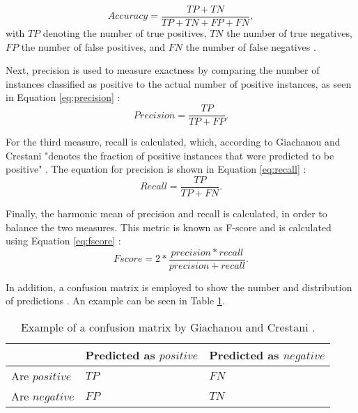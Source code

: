 \begin{equation}
    \label{eq:accuracy}
    Accuracy = \frac{TP + TN}{TP + TN + FP + FN},
\end{equation}
with $TP$ denoting the number of true positives, $TN$ the number of true negatives, $FP$ the number of false positives, and $FN$ the number of false negatives \cite{DBLP:journals/csur/GiachanouC16}.

Next, precision is used to measure exactness by comparing the number of instances classified as positive to the actual number of positive instances, as seen in Equation \eqref{eq:precision} \cite{DBLP:journals/csur/GiachanouC16}:
\begin{equation}
    \label{eq:precision}
    Precision = \frac{TP}{TP + FP}.
\end{equation}

For the third measure, recall is calculated, which, according to Giachanou and Crestani "denotes the fraction of positive instances that were predicted to be positive" \cite[p.~28:12]{DBLP:journals/csur/GiachanouC16}. The equation for precision is shown in Equation \eqref{eq:recall} \cite{DBLP:journals/csur/GiachanouC16}:
\begin{equation}
    \label{eq:recall}
    Recall = \frac{TP}{TP + FN}.
\end{equation}

Finally, the harmonic mean of precision and recall is calculated, in order to balance the two measures. This metric is known as F-score and is calculated using Equation \eqref{eq:fscore} \cite{DBLP:journals/csur/GiachanouC16}:
\begin{equation}
    \label{eq:fscore}
    Fscore = 2*\frac{precision * recall}{precision + recall}.
\end{equation}

In addition, a confusion matrix is employed to show the number and distribution of predictions \cite{DBLP:journals/csur/GiachanouC16}. An example can be seen in Table \ref{tab:conf_example}.

\begin{table}[h!]
\centering
\caption{Example of a confusion matrix by Giachanou and Crestani \cite[p.~28:11]{DBLP:journals/csur/GiachanouC16}.}
\begin{tabular}{ |p{3cm}||p{3cm}|p{3cm}| }
 \hline
  &          Predicted as $positive$ &Predicted as $negative$  \\
 \hline
 Are $positive$        & $TP$&            $FN$\\
  \hline
 Are $negative$  &$FP$&                     $TN$\\
 \hline

\end{tabular}
\label{tab:conf_example}
\end{table}


